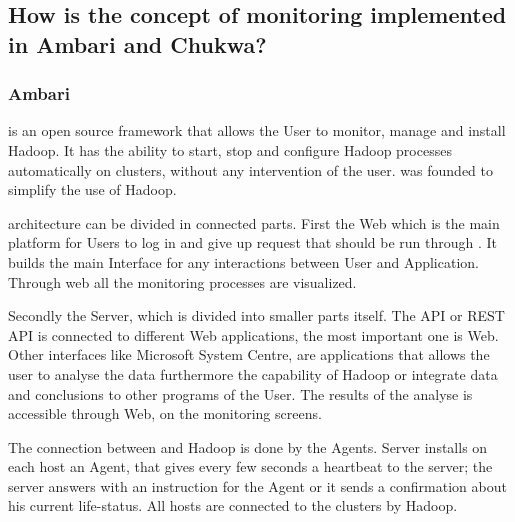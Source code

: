 \subsection{How is the concept of monitoring implemented in Ambari and Chukwa?}
\label{subsec:Implementation}

\subsubsection{Ambari}
\amb is an open source framework that allows the User to monitor, manage and install Hadoop.\cite{ChukwaPoster} It has the ability to start, stop and configure Hadoop processes automatically on clusters, without any intervention of the user.\cite{Hortonworks2013} \amb was founded to simplify the use of Hadoop.\cite{Hortonworks2013}

\amb architecture can be divided in connected parts. First the \amb Web which is the main platform for Users to log in and give up request that should be run through \amb.\cite{Sako} It builds the main Interface for any interactions between User and Application.\cite{Sako} Through \amb web all the monitoring processes are visualized. 

Secondly the \amb Server, which is divided into smaller parts itself.\cite{Sako} The API or REST API is connected to different Web applications, the most important one is \amb Web.\cite{Sako} Other interfaces like Microsoft System Centre, are applications that allows the user to analyse the data furthermore the capability of Hadoop or integrate data and conclusions to other programs of the User.\cite{Hortonworks2013} The results of the analyse is accessible through \amb Web, on the monitoring screens.\cite{Sako}

The connection between \amb and Hadoop is done by the \amb Agents.\cite{Sako} \amb Server installs on each host an \amb Agent, that gives every few seconds a heartbeat to the server; the server answers with an instruction for the Agent or it sends a confirmation about his current life-status.\cite{Sako} All hosts are connected to the clusters by Hadoop.\cite{Sako}

